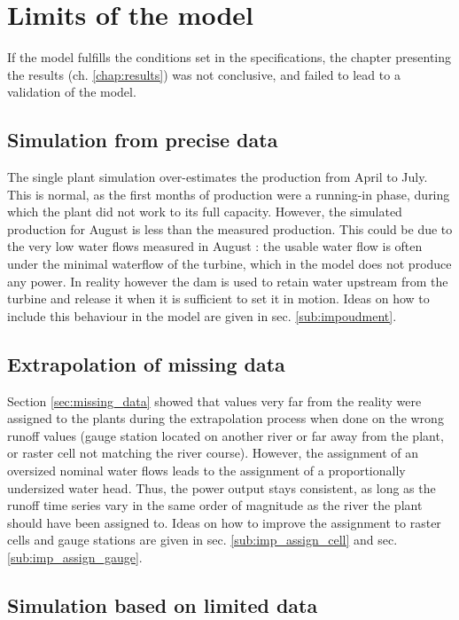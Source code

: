 \section{Limits of the model}
\label{sec:limits}
If the model fulfills the conditions set in the specifications, the chapter presenting the results (ch. \ref{chap:results}) was not conclusive, and failed to lead to a validation of the model.
\subsection{Simulation from precise data}
\label{sub:lim_single}
The single plant simulation over-estimates the production from April to July. This is normal, as the first months of production were a running-in phase, during which the plant did not work to its full capacity. However, the simulated production for August is less than the measured production. This could be due to the very low water flows measured in August : the usable water flow is often under the minimal waterflow of the turbine, which in the model does not produce any power. In reality however the dam is used to retain water upstream from the turbine and release it when it is sufficient to set it in motion. Ideas on how to include this behaviour in the model are given in sec. \ref{sub:impoudment}.

\subsection{Extrapolation of missing data}
\label{sub:lim_extra}
Section \ref{sec:missing_data} showed that values very far from the reality were assigned to the plants during the extrapolation process when done on the wrong runoff values (gauge station located on another river or far away from the plant, or raster cell not matching the river course). However, the assignment of an oversized nominal water flows leads to the assignment of a proportionally undersized water head. Thus, the power output stays consistent, as long as the runoff time series vary in the same order of magnitude as the river the plant should have been assigned to. Ideas on how to improve the assignment to raster cells and gauge stations are given in sec. \ref{sub:imp_assign_cell} and sec. \ref{sub:imp_assign_gauge}.

\subsection{Simulation based on limited data}


